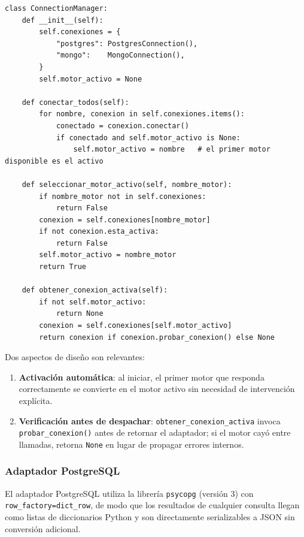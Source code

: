 \documentclass[12pt,letterpaper]{article}
\begin{document}
\begin{lstlisting}[style=pycode, caption={\texttt{ConnectionManager}: inicialización y cambio de motor (\texttt{connection\_manager.py})}]
class ConnectionManager:
    def __init__(self):
        self.conexiones = {
            "postgres": PostgresConnection(),
            "mongo":    MongoConnection(),
        }
        self.motor_activo = None

    def conectar_todos(self):
        for nombre, conexion in self.conexiones.items():
            conectado = conexion.conectar()
            if conectado and self.motor_activo is None:
                self.motor_activo = nombre   # el primer motor disponible es el activo

    def seleccionar_motor_activo(self, nombre_motor):
        if nombre_motor not in self.conexiones:
            return False
        conexion = self.conexiones[nombre_motor]
        if not conexion.esta_activa:
            return False
        self.motor_activo = nombre_motor
        return True

    def obtener_conexion_activa(self):
        if not self.motor_activo:
            return None
        conexion = self.conexiones[self.motor_activo]
        return conexion if conexion.probar_conexion() else None
\end{lstlisting}

Dos aspectos de diseño son relevantes:

\begin{enumerate}[leftmargin=2em]
  \item \textbf{Activación automática}: al iniciar, el primer motor que responda correctamente
        se convierte en el motor activo sin necesidad de intervención explícita.
  \item \textbf{Verificación antes de despachar}: \texttt{obtener\_conexion\_activa} invoca
        \texttt{probar\_conexion()} antes de retornar el adaptador; si el motor cayó entre
        llamadas, retorna \texttt{None} en lugar de propagar errores internos.
\end{enumerate}

\subsubsection{Adaptador PostgreSQL}

El adaptador PostgreSQL utiliza la librería \texttt{psycopg} (versión 3) con
\texttt{row\_factory=dict\_row}, de modo que los resultados de cualquier consulta llegan como
listas de diccionarios Python y son directamente serializables a JSON sin conversión adicional.
\end{document}
